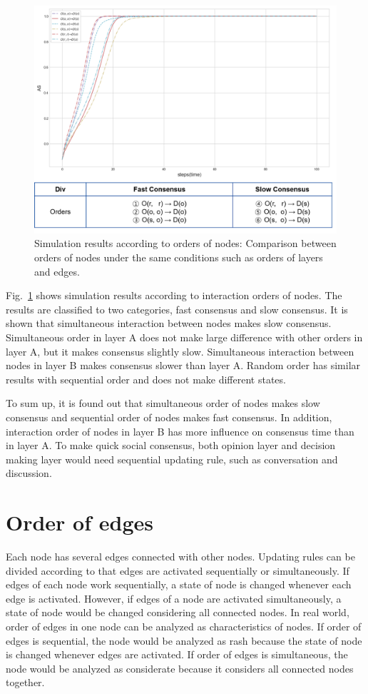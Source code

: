 \begin{figure}[!htb]
	\centering
	\includegraphics[width=\hsize]{figure/chap4_nodeorder.png}
	\caption{Simulation results according to orders of nodes: Comparison between orders of nodes under the same conditions such as orders of layers and edges.}
	\label{chap4_nodeorder}
\end{figure}

Fig.~\ref{chap4_nodeorder} shows simulation results according to interaction orders of nodes. The results are classified to two categories, fast consensus and slow consensus. It is shown that simultaneous interaction between nodes makes slow consensus. Simultaneous order in layer A does not make large difference with other orders in layer A, but it makes consensus slightly slow. Simultaneous interaction between nodes in layer B makes consensus slower than layer A. Random order has similar results with sequential order and does not make different states. 

To sum up, it is found out that simultaneous order of nodes makes slow consensus and sequential order of nodes makes fast consensus. In addition, interaction order of nodes in layer B has more influence on consensus time than in layer A. To make quick social consensus, both opinion layer and decision making layer would need sequential updating rule, such as conversation and discussion.\\     

\section{Order of edges}
Each node has several edges connected with other nodes. Updating rules can be divided according to that edges are activated sequentially or simultaneously. If edges of each node work sequentially, a state of node is changed whenever each edge is activated. However, if edges of a node are activated simultaneously, a state of node would be changed considering all connected nodes. In real world, order of edges in one node can be analyzed as characteristics of nodes. If order of edges is sequential, the node would be analyzed as rash because the state of node is changed whenever edges are activated. If order of edges is simultaneous, the node would be analyzed as considerate because it considers all connected nodes together. 

